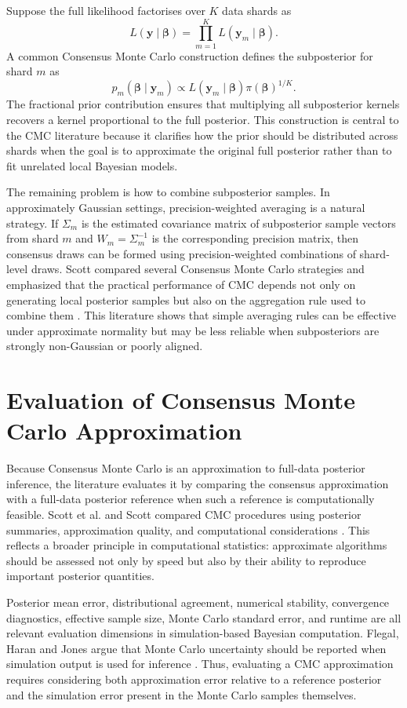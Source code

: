 Suppose the full likelihood factorises over $K$ data shards as
\[
L(\mathbf{y}\mid\boldsymbol{\beta})
=
\prod_{m=1}^{K}
L(\mathbf{y}_m\mid\boldsymbol{\beta}).
\]
A common Consensus Monte Carlo construction defines the subposterior for shard $m$ as
\[
p_m(\boldsymbol{\beta}\mid\mathbf{y}_m)
\propto
L(\mathbf{y}_m\mid\boldsymbol{\beta})
\pi(\boldsymbol{\beta})^{1/K}.
\]
The fractional prior contribution ensures that multiplying all subposterior kernels recovers a kernel proportional to the full posterior. This construction is central to the CMC literature because it clarifies how the prior should be distributed across shards when the goal is to approximate the original full posterior rather than to fit unrelated local Bayesian models.

The remaining problem is how to combine subposterior samples. In approximately Gaussian settings, precision-weighted averaging is a natural strategy. If $\Sigma_m$ is the estimated covariance matrix of subposterior sample vectors from shard $m$ and $W_m=\Sigma_m^{-1}$ is the corresponding precision matrix, then consensus draws can be formed using precision-weighted combinations of shard-level draws. Scott compared several Consensus Monte Carlo strategies and emphasized that the practical performance of CMC depends not only on generating local posterior samples but also on the aggregation rule used to combine them \cite{scott2017comparing}. This literature shows that simple averaging rules can be effective under approximate normality but may be less reliable when subposteriors are strongly non-Gaussian or poorly aligned.

\section{Evaluation of Consensus Monte Carlo Approximation}

Because Consensus Monte Carlo is an approximation to full-data posterior inference, the literature evaluates it by comparing the consensus approximation with a full-data posterior reference when such a reference is computationally feasible. Scott et al. and Scott compared CMC procedures using posterior summaries, approximation quality, and computational considerations \cite{scott2016bayes,scott2017comparing}. This reflects a broader principle in computational statistics: approximate algorithms should be assessed not only by speed but also by their ability to reproduce important posterior quantities.

Posterior mean error, distributional agreement, numerical stability, convergence diagnostics, effective sample size, Monte Carlo standard error, and runtime are all relevant evaluation dimensions in simulation-based Bayesian computation. Flegal, Haran and Jones argue that Monte Carlo uncertainty should be reported when simulation output is used for inference \cite{flegal2008mcmc}. Thus, evaluating a CMC approximation requires considering both approximation error relative to a reference posterior and the simulation error present in the Monte Carlo samples themselves.

